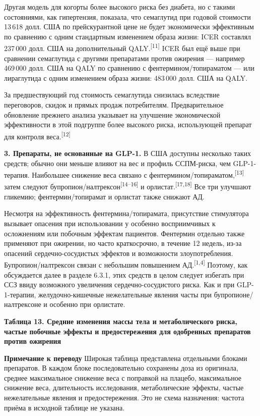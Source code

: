 \documentclass[11pt,a4paper]{article}
\newcommand{\src}[1]{\textsuperscript{[#1]}}
\newcommand{\editorial}[1]{\par\begingroup\small\color{black!70}\textbf{Примечание к переводу} #1\par\endgroup}
\newcommand{\heading}[1]{\par\medskip\textbf{#1}\par}
\begin{document}
Другая модель для когорты более высокого риска без диабета, но с такими состояниями, как гипертензия, показала, что семаглутид при годовой стоимости 13\,618 долл. США по прейскурантной цене не будет экономически эффективным по сравнению с одним стандартным изменением образа жизни: ICER составлял 237\,000 долл. США на дополнительный QALY.\src{11} ICER был ещё выше при сравнении семаглутида с другими препаратами против ожирения --- например 469\,000 долл. США на QALY по сравнению с фентермином/топираматом --- или лираглутида с одним изменением образа жизни: 483\,000 долл. США на QALY.

За предшествующий год стоимость семаглутида снизилась вследствие переговоров, скидок и прямых продаж потребителям. Предварительное обновление прежнего анализа указывает на улучшение экономической эффективности в этой подгруппе более высокого риска, использующей препарат для контроля веса.\src{12}

\textbf{3. Препараты, не основанные на GLP-1.} В США доступны несколько таких средств; обычно они меньше влияют на вес и профиль ССПМ-риска, чем GLP-1-терапия. Наибольшее снижение веса связано с фентермином/топираматом,\src{13} затем следуют бупропион/налтрексон\src{14--16} и орлистат.\src{17,18} Все три улучшают гликемию; фентермин/топирамат и орлистат также снижают АД.

Несмотря на эффективность фентермина/топирамата, присутствие стимулятора вызывает опасения при использовании у особенно восприимчивых к осложнениям или побочным эффектам пациентов. Фентермин отдельно также применяют при ожирении, но часто краткосрочно, в течение 12 недель, из-за опасений сердечно-сосудистых эффектов и возможности злоупотребления. Бупропион/налтрексон связан с небольшим повышением АД.\src{1,4} Поэтому, как обсуждается далее в разделе 6.3.1, этих средств в целом следует избегать при ССЗ ввиду возможного увеличения сердечно-сосудистого риска. Как и при GLP-1-терапии, желудочно-кишечные нежелательные явления часты при бупропионе/налтрексоне и особенно при орлистате.

\heading{Таблица 13. Средние изменения массы тела и метаболического риска, частые побочные эффекты и предостережения для одобренных препаратов против ожирения}
\editorial{Широкая таблица представлена отдельными блоками препаратов. В каждом блоке последовательно сохранены доза из оригинала, среднее максимальное снижение веса с поправкой на плацебо, максимальное снижение веса, длительность исследования, метаболические эффекты, частые нежелательные явления и предостережения. Это не схема назначения: частота приёма в исходной таблице не указана.}
\end{document}
